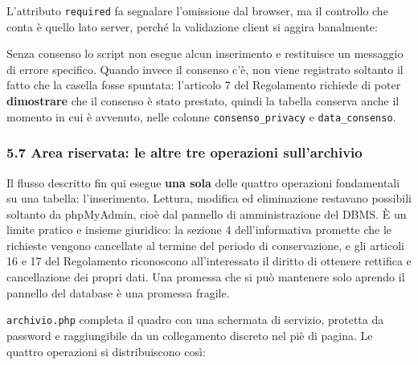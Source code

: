 \documentclass[
  11pt,
]{article}
\newenvironment{Shaded}{\begin{snugshade}}{\end{snugshade}}
\newcommand{\KeywordTok}[1]{\textcolor[rgb]{0.13,0.29,0.53}{\textbf{#1}}}
\newcommand{\NormalTok}[1]{#1}
\newcommand{\OperatorTok}[1]{\textcolor[rgb]{0.81,0.36,0.00}{\textbf{#1}}}
\newcommand{\OtherTok}[1]{\textcolor[rgb]{0.56,0.35,0.01}{#1}}
\newcommand{\StringTok}[1]{\textcolor[rgb]{0.31,0.60,0.02}{#1}}
\newcommand{\VariableTok}[1]{\textcolor[rgb]{0.00,0.00,0.00}{#1}}
\begin{document}
L'attributo \texttt{required} fa segnalare l'omissione dal browser, ma
il controllo che conta è quello lato server, perché la validazione
client si aggira banalmente:

\begin{Shaded}
\end{Shaded}

Senza consenso lo script non esegue alcun inserimento e restituisce un
messaggio di errore specifico. Quando invece il consenso c'è, non viene
registrato soltanto il fatto che la casella fosse spuntata: l'articolo 7
del Regolamento richiede di poter \textbf{dimostrare} che il consenso è
stato prestato, quindi la tabella conserva anche il momento in cui è
avvenuto, nelle colonne \texttt{consenso\_privacy} e
\texttt{data\_consenso}.

\hypertarget{area-riservata-le-altre-tre-operazioni-sullarchivio}{%
\subsubsection{5.7 Area riservata: le altre tre operazioni
sull'archivio}\label{area-riservata-le-altre-tre-operazioni-sullarchivio}}

Il flusso descritto fin qui esegue \textbf{una sola} delle quattro
operazioni fondamentali su una tabella: l'inserimento. Lettura, modifica
ed eliminazione restavano possibili soltanto da phpMyAdmin, cioè dal
pannello di amministrazione del DBMS. È un limite pratico e insieme
giuridico: la sezione 4 dell'informativa promette che le richieste
vengono cancellate al termine del periodo di conservazione, e gli
articoli 16 e 17 del Regolamento riconoscono all'interessato il diritto
di ottenere rettifica e cancellazione dei propri dati. Una promessa che
si può mantenere solo aprendo il pannello del database è una promessa
fragile.

\texttt{archivio.php} completa il quadro con una schermata di servizio,
protetta da password e raggiungibile da un collegamento discreto nel piè
di pagina. Le quattro operazioni si distribuiscono così:
\end{document}

